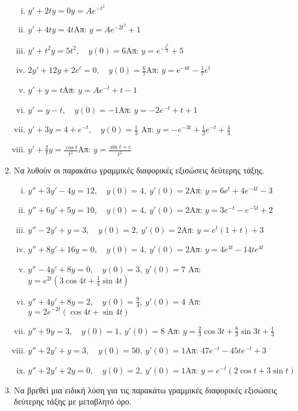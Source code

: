 \begin{enumerate}
\begin{enumerate}[i)]
      \item $y'+2ty=0$\hfill $y=Ae^{-t^2}$
      \item $y'+4ty=4t$\hfill Απ: $y=Ae^{-2t^2}+1$
      \item $y'+t^2y=5t^2,\quad y(0)=6$\hfill Απ: $y=e^{-\frac{t^3}{3}}+5$
      \item $2y'+12y+2e^t=0,\quad y(0)=\frac{6}{7}$\hfill Απ: $y=e^{-6t}-\frac{1}{7}e^t$
      \item $y'+y=t$\hfill Απ: $y=Ae^{-t}+t-1$
      \item $y'=y-t,\quad y(0)=-1$\hfill Απ: $y=-2e^{-t}+t+1$
      \item $y'+3y=4+e^{-t},\quad y(0)=\frac{1}{3}$
        \hfill Απ: $y=-e^{-3t}+\frac{1}{2}e^{-t}+\frac{4}{3}$
      \item $y'+\frac{2}{t}y=\frac{\cos t}{t^2}$\hfill Απ: $y=\frac{\sin t +c}{t^2}$

    \end{enumerate}

  \item Να λυθούν οι παρακάτω γραμμικές διαφορικές εξισώσεις δεύτερης τάξης.

    \begin{enumerate}[i)]

      \item $y''+3y'-4y=12,\quad y(0)=4,\ y'(0)=2$\hfill Απ: $y=6e^t+4e^{-4t}-3$
      \item $y''+6y'+5y=10,\quad y(0)=4,\ y'(0)=2$\hfill Απ: $y=3e^{-t}-e^{-5t}+2$
      \item $y''-2y'+y=3,\quad y(0)=2,\ y'(0)=2$\hfill Απ: $y=e^t(1+t)+3$
      \item $y''+8y'+16y=0,\quad y(0)=4,\ y'(0)=2$\hfill Απ: $y=4e^{4t}-14te^{4t}$
      \item $y''-4y'+8y=0,\quad y(0)=3,\ y'(0)=7$
        \hfill Απ: $y=e^{2t}(3\cos 4t + \frac{1}{4}\sin 4t)$
      \item $y''+4y'+8y=2,\quad y(0)=\frac{9}{4},\ y'(0)=4$
        \hfill Απ: $y=2e^{-2t}(\cos 4t+\sin 4t)$
      \item $y''+9y=3,\quad y(0)=1,\ y'(0)=8$
        \hfill Απ: $y=\frac{2}{3}\cos 3t + \frac{8}{3}\sin 3t +\frac{1}{3}$
      \item $y''+2y'+y=3,\quad y(0)=50,\ y'(0)=1$\hfill Απ: $47e^{-t}-45te^{-t}+3$
      \item $y''+2y'+2y=0,\quad y(0)=2,\ y'(0)=1$\hfill Απ: $y=e^{-t}(2\cos t + 3\sin t)$
    \end{enumerate}


  \item Να βρεθεί μια ειδική λύση για τις παρακάτω γραμμικές διαφορικές εξισώσεις 
    δεύτερης τάξης με μεταβλητό όρο.


\end{enumerate}
